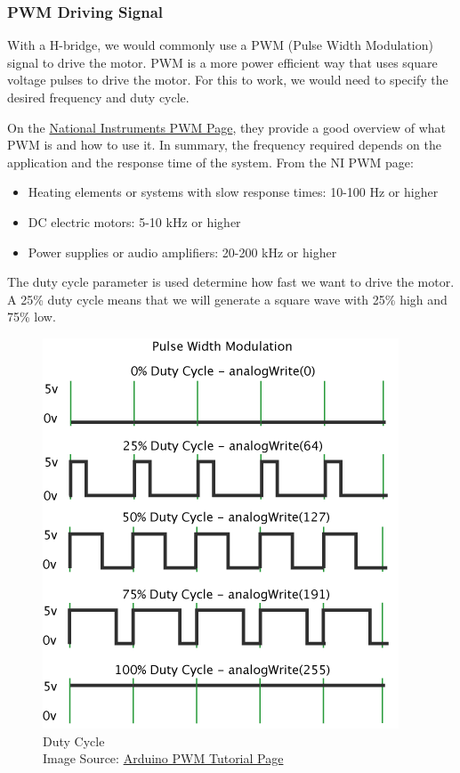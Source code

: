 \documentclass[paper=a4, fontsize=11pt]{article} %
\providecommand{\tightlist}{%
  \setlength{\itemsep}{0pt}\setlength{\parskip}{0pt}}
\numberwithin{equation}{section} %
\numberwithin{figure}{section} %
\numberwithin{table}{section} %
\begin{document}
\hypertarget{pwm-driving-signal}{%
\subsubsection{PWM Driving Signal}\label{pwm-driving-signal}}

With a H-bridge, we would commonly use a PWM (Pulse Width Modulation) signal to drive the motor. PWM is a more power efficient way that uses square voltage pulses to drive the motor. For this to work, we would need to specify the desired frequency and duty cycle.

On the
\href{https://knowledge.ni.com/KnowledgeArticleDetails?id=kA00Z0000019OkFSAU\&l=en-AU}{National
Instruments PWM Page}, they provide a good overview of what PWM is and
how to use it. In summary, the frequency required depends on the
application and the response time of the system. From the NI PWM page:

\begin{itemize}
\tightlist
\item
  Heating elements or systems with slow response times: 10-100 Hz or
  higher
\item
  DC electric motors: 5-10 kHz or higher
\item
  Power supplies or audio amplifiers: 20-200 kHz or higher
\end{itemize}

The duty cycle parameter is used determine how fast we want to drive the
motor. A 25\% duty cycle means that we will generate a square wave with
25\% high and 75\% low.

\begin{figure}[H]
\centering
\includegraphics[width = 0.5 \textwidth]{2019-08-05-22-03-08.png}
\caption{Duty Cycle \\
Image Source: \href{https://www.arduino.cc/en/Tutorial/PWM}{Arduino PWM Tutorial Page}}
\end{figure}
\end{document}
